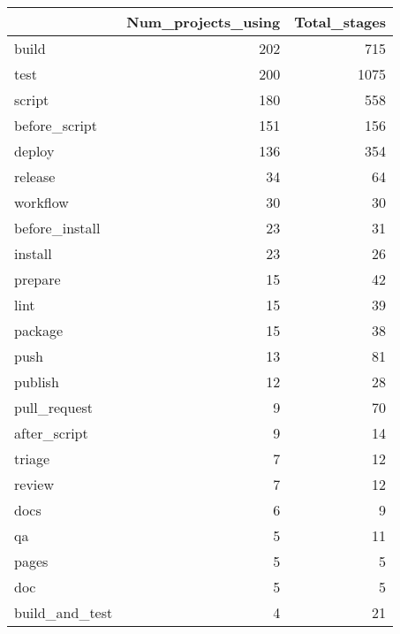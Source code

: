 \begin{tabular}{lrr}
\toprule
{} &  Num\_projects\_using &  Total\_stages \\
\midrule
build                      &                 202 &           715 \\
test                       &                 200 &          1075 \\
script                     &                 180 &           558 \\
before\_script              &                 151 &           156 \\
deploy                     &                 136 &           354 \\
release                    &                  34 &            64 \\
workflow                   &                  30 &            30 \\
before\_install             &                  23 &            31 \\
install                    &                  23 &            26 \\
prepare                    &                  15 &            42 \\
lint                       &                  15 &            39 \\
package                    &                  15 &            38 \\
push                       &                  13 &            81 \\
publish                    &                  12 &            28 \\
pull\_request               &                   9 &            70 \\
after\_script               &                   9 &            14 \\
triage                     &                   7 &            12 \\
review                     &                   7 &            12 \\
docs                       &                   6 &             9 \\
qa                         &                   5 &            11 \\
pages                      &                   5 &             5 \\
doc                        &                   5 &             5 \\
build\_and\_test             &                   4 &            21 \\

\end{tabular}
